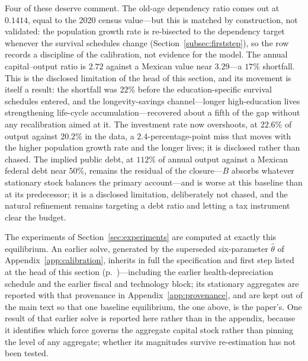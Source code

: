 \documentclass[12pt,a4paper]{article}
\begin{document}
Four of these deserve comment. The old-age dependency ratio comes out at $0.1414$, equal to the 2020 census value---but this is matched by construction, not validated: the population growth rate is re-bisected to the dependency target whenever the survival schedules change (Section~\ref{subsec:firststep}), so the row records a discipline of the calibration, not evidence for the model. The annual capital--output ratio is $2.72$ against a Mexican value near $3.29$---a $17\%$ shortfall. This is the disclosed limitation of the head of this section, and its movement is itself a result: the shortfall was $22\%$ before the education-specific survival schedules entered, and the longevity-savings channel---longer high-education lives strengthening life-cycle accumulation---recovered about a fifth of the gap without any recalibration aimed at it. The investment rate now overshoots, at $22.6\%$ of output against $20.2\%$ in the data, a $2.4$-percentage-point miss that moves with the higher population growth rate and the longer lives; it is disclosed rather than chased. The implied public debt, at $112\%$ of annual output against a Mexican federal debt near $50\%$, remains the residual of the closure---$B$ absorbs whatever stationary stock balances the primary account---and is worse at this baseline than at its predecessor; it is a disclosed limitation, deliberately not chased, and the natural refinement remains targeting a debt ratio and letting a tax instrument clear the budget.

The experiments of Section~\ref{sec:experiments} are computed at exactly this equilibrium. An earlier solve, generated by the superseded six-parameter $\widehat\theta$ of Appendix~\ref{app:calibration}, inherits in full the specification and first step listed at the head of this section (p.~\pageref{par:superseded})---including the earlier health-depreciation schedule and the earlier fiscal and technology block; its stationary aggregates are reported with that provenance in Appendix~\ref{app:provenance}, and are kept out of the main text so that one baseline equilibrium, the one above, is the paper's. One result of that earlier solve is reported here rather than in the appendix, because it identifies which force governs the aggregate capital stock rather than pinning the level of any aggregate; whether its magnitudes survive re-estimation has not been tested.
\end{document}
